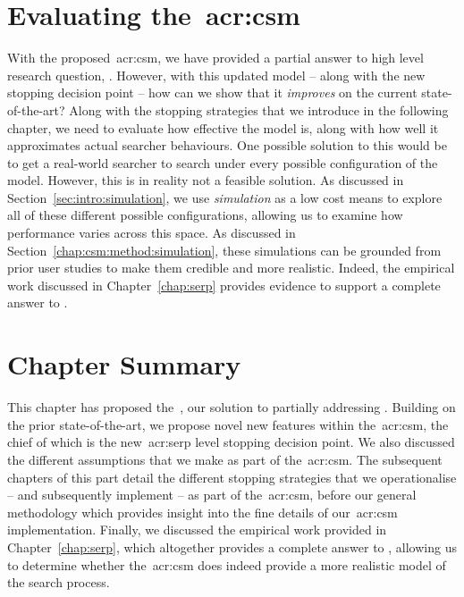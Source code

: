\section{Evaluating the~\gls{acr:csm}}
With the proposed~\gls{acr:csm}, we have provided a partial answer to high level research question, . However, with this updated model -- along with the new stopping decision point -- how can we show that it \emph{improves} on the current state-of-the-art? Along with the stopping strategies that we introduce in the following chapter, we need to evaluate how effective the model is, along with how well it approximates actual searcher behaviours. One possible solution to this would be to get a real-world searcher to search under every possible configuration of the model. However, this is in reality not a feasible solution. As discussed in Section~\ref{sec:intro:simulation}, we use \emph{simulation} as a low cost means to explore all of these different possible configurations, allowing us to examine how performance varies across this space. As discussed in Section~\ref{chap:csm:method:simulation}, these simulations can be grounded from prior user studies to make them credible and more realistic. Indeed, the empirical work discussed in Chapter~\ref{chap:serp} provides evidence to support a complete answer to .

\section{Chapter Summary}
This chapter has proposed the~, our solution to partially addressing . Building on the prior state-of-the-art, we propose novel new features within the~\gls{acr:csm}, the chief of which is the new~\gls{acr:serp} level stopping decision point. We also discussed the different assumptions that we make as part of the~\gls{acr:csm}. The subsequent chapters of this part detail the different stopping strategies that we operationalise -- and subsequently implement -- as part of the~\gls{acr:csm}, before our general methodology which provides insight into the fine details of our~\gls{acr:csm} implementation. Finally, we discussed the empirical work provided in Chapter~\ref{chap:serp}, which altogether provides a complete answer to , allowing us to determine whether the~\gls{acr:csm} does indeed provide a more realistic model of the search process.

